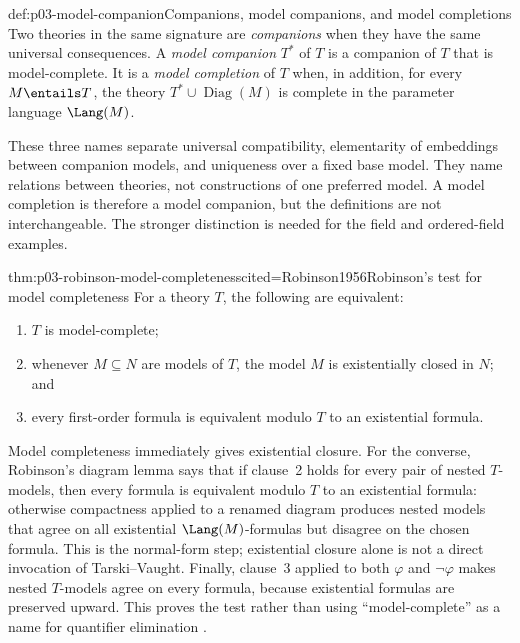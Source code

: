 \begin{hbdefinition}{def:p03-model-companion}{Companions, model companions, and model completions}
Two theories in the same signature are \emph{companions} when they have the
same universal consequences.  A \emph{model companion} \(T^*\) of \(T\) is
a companion of \(T\) that is model-complete.  It is a
\emph{model completion} of \(T\) when, in addition, for every
\(M\entails T\), the theory
\(T^*\cup\operatorname{Diag}(M)\) is complete in the parameter language
\(\Lang(M)\).

These three names separate universal compatibility, elementarity of
embeddings between companion models, and uniqueness over a fixed base model.
They name relations between theories, not constructions of one preferred
model.  A model completion is therefore a model companion, but the definitions
are not interchangeable.  The stronger distinction is needed for the field
and ordered-field examples.
\end{hbdefinition}

\begin{hbtheorem}{thm:p03-robinson-model-completeness}{cited=Robinson1956}{Robinson's test for model completeness}
For a theory \(T\), the following are equivalent:
\begin{enumerate}
  \item \(T\) is model-complete;
  \item whenever \(M\subseteq N\) are models of \(T\), the model \(M\) is
        existentially closed in \(N\); and
  \item every first-order formula is equivalent modulo \(T\) to an
        existential formula.
\end{enumerate}
\end{hbtheorem}

Model completeness immediately gives existential closure.  For the converse,
Robinson's diagram lemma says that if clause~2 holds for every pair of nested
\(T\)-models, then every formula is equivalent modulo \(T\) to an existential
formula: otherwise compactness applied to a renamed diagram produces nested
models that agree on all existential \(\Lang(M)\)-formulas but disagree on the
chosen formula.  This is the normal-form step; existential closure alone is
not a direct invocation of Tarski--Vaught.  Finally, clause~3 applied to both
\(\varphi\) and \(\neg\varphi\) makes nested \(T\)-models agree on every
formula, because existential formulas are preserved upward.  This proves the
test rather than using ``model-complete'' as a name for quantifier elimination
\cite{Robinson1956,ChangKeisler1990}.

